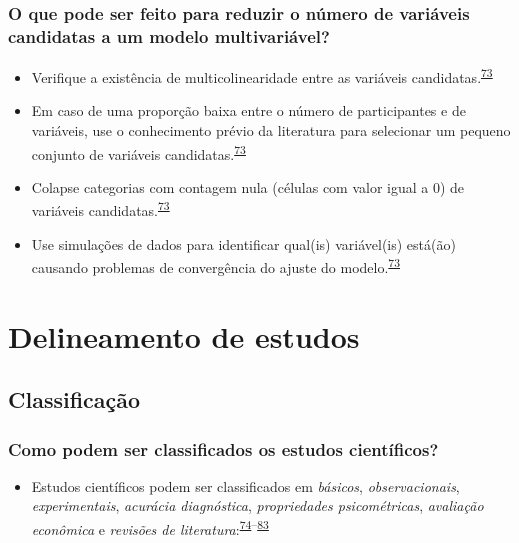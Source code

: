 \documentclass[
]{book}
\providecommand{\tightlist}{%
  \setlength{\itemsep}{0pt}\setlength{\parskip}{0pt}}
\begin{document}
\hypertarget{o-que-pode-ser-feito-para-reduzir-o-nuxfamero-de-variuxe1veis-candidatas-a-um-modelo-multivariuxe1vel}{%
\subsection{O que pode ser feito para reduzir o número de variáveis candidatas a um modelo multivariável?}\label{o-que-pode-ser-feito-para-reduzir-o-nuxfamero-de-variuxe1veis-candidatas-a-um-modelo-multivariuxe1vel}}

\begin{itemize}
\item
  Verifique a existência de multicolinearidade entre as variáveis candidatas.\textsuperscript{\protect\hyperlink{ref-Sun1996}{73}}
\item
  Em caso de uma proporção baixa entre o número de participantes e de variáveis, use o conhecimento prévio da literatura para selecionar um pequeno conjunto de variáveis candidatas.\textsuperscript{\protect\hyperlink{ref-Sun1996}{73}}
\item
  Colapse categorias com contagem nula (células com valor igual a 0) de variáveis candidatas.\textsuperscript{\protect\hyperlink{ref-Sun1996}{73}}
\item
  Use simulações de dados para identificar qual(is) variável(is) está(ão) causando problemas de convergência do ajuste do modelo.\textsuperscript{\protect\hyperlink{ref-Sun1996}{73}}
\end{itemize}

\hypertarget{delineamento-estudos}{%
\chapter{\texorpdfstring{\textbf{Delineamento de estudos}}{Delineamento de estudos}}\label{delineamento-estudos}}

\hypertarget{classificacao}{%
\section{Classificação}\label{classificacao}}

\hypertarget{como-podem-ser-classificados-os-estudos-cientuxedficos}{%
\subsection{Como podem ser classificados os estudos científicos?}\label{como-podem-ser-classificados-os-estudos-cientuxedficos}}

\begin{itemize}
\tightlist
\item
  Estudos científicos podem ser classificados em \emph{básicos}, \emph{observacionais}, \emph{experimentais}, \emph{acurácia diagnóstica}, \emph{propriedades psicométricas}, \emph{avaliação econômica} e \emph{revisões de literatura}:\textsuperscript{\protect\hyperlink{ref-Grant2009}{74}--\protect\hyperlink{ref-chipman2022}{83}}
\end{itemize}
\end{document}
